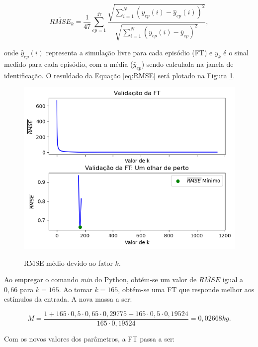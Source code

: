\documentclass[12pt,           %
a4paper,                       %
openany,                       %
oneside,                       %
chapter=TITLE,                 %
english,                       %
spanish,                       %
brazil,                        %
sumario=tradicional]{abntex2}  %
\begin{document}
\begin{OnehalfSpace}
\begin{equation}
    \overline{RMSE}_k = \frac{1}{47} \sum_{ep=1}^{47} \frac{\sqrt{\sum_{i=1}^{N}(y_{ep}(i)-\hat{y}_{ep}(i))^2}}{\sqrt{\sum_{i=1}^{N}(y_{ep}(i)-\bar{y}_{ep})^2}},
\label{eq:RMSE}
\end{equation}

\noindent onde $\hat{y}_{ep}(i)$ representa a simulação livre para cada episódio (FT) e ${y}_k$ é o sinal medido para cada episódio, com a média ($\bar{y}_{ep}$) sendo calculada na janela de identificação. O resuldado da Equação \ref{eq:RMSE} será plotado na Figura \ref{fig:R}.

\begin{figure}[H]
     \centering
     \vspace*{-0.25cm}
     \caption{RMSE médio devido ao fator $k$.}
     \includegraphics[scale=.53]{RMSE1.png}
     \label{fig:R}
\end{figure}
\vspace*{-.85cm}
{\raggedright {}}

Ao empregar o comando \textit{min} do Python, obtém-se um valor de $\overline{RMSE}$ igual a $0,66$ para $k=165$. Ao tomar $k=165$, obtém-se uma FT que responde melhor aos estímulos da entrada. A nova massa a ser:

\begin{equation}
    M = \frac{1 + 165\cdot0,5\cdot0,65\cdot0,29775-165\cdot0,5\cdot0,19524}{165\cdot0,19524} = 0,02668 kg.
    \label{eq:MV}
\end{equation}

Com os novos valores dos parâmetros, a FT passa a ser:


\end{OnehalfSpace}
\end{document}
